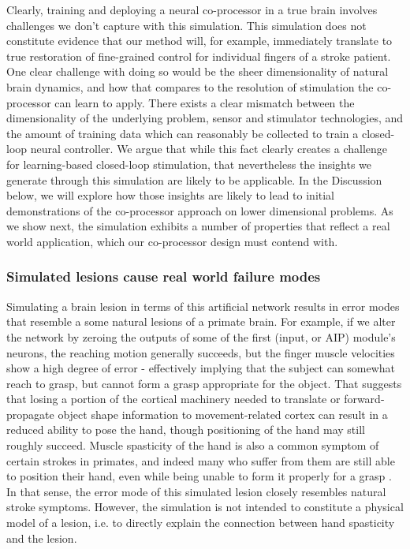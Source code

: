 \documentclass[12pt]{iopart}
\begin{document}
Clearly, training and deploying a neural co-processor in a true brain involves challenges we
don't capture with this simulation. This simulation does not constitute evidence
that our method will, for example, immediately translate to true restoration of fine-grained
control for individual fingers of a stroke patient. One clear challenge with doing so would
be the sheer dimensionality of natural brain dynamics, and how that compares to the resolution
of stimulation the co-processor can learn to apply. There exists a clear mismatch between
the dimensionality of the underlying problem, sensor and stimulator technologies, and the
amount of training data which can reasonably be collected to train a closed-loop neural
controller. We argue that while this fact clearly creates a challenge for learning-based
closed-loop stimulation, that nevertheless the insights we generate through this
simulation are likely to be applicable. In the Discussion below, we will explore how
those insights are likely to lead to initial demonstrations of the co-processor approach
on lower dimensional problems. As we show next, the simulation exhibits a number of
properties that reflect a real world application, which our co-processor design must
contend with.

\subsubsection{Simulated lesions cause real world failure modes}
Simulating a brain lesion in terms of this artificial network results in error
modes that resemble a some natural lesions of a primate brain. For example, if we
alter the network by zeroing the outputs of some of the first (input, or AIP) module's neurons,
the reaching motion generally succeeds, but the finger muscle velocities show a high degree
of error - effectively implying that the subject can somewhat reach to grasp, but cannot form a
grasp appropriate for the object. That suggests that losing a portion of the cortical
machinery needed to translate or forward-propagate object shape information
to movement-related cortex can result in a reduced ability to pose the hand, though
positioning of the hand may still roughly succeed. Muscle spasticity of
the hand is also a common symptom of certain strokes in primates, and indeed many who
suffer from them are still able to position their hand, even while being unable to form
it properly for a grasp \cite{khanna.openloop,puthenveettil.hand}. In that sense, the
error mode of this simulated lesion closely resembles natural stroke symptoms. However,
the simulation is not intended to constitute a physical model of a lesion, i.e. to
directly explain the connection between hand spasticity and the lesion.
\end{document}
